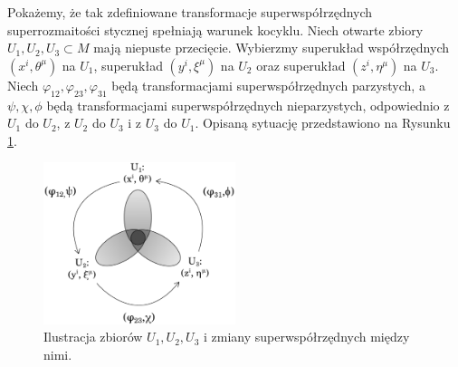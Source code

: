\documentclass[11pt,a4paper]{report}
\theoremstyle{definition}
\begin{document}
Pokażemy, że tak zdefiniowane transformacje superwspółrzędnych superrozmaitości stycznej spełniają warunek kocyklu. Niech otwarte zbiory $U_1, U_2, U_3 \subset M$ mają niepuste przecięcie. Wybierzmy superukład współrzędnych $(x^i, \theta^\mu)$ na $U_1$, superukład $(y^i, \xi^\mu)$ na $U_2$ oraz superukład $(z^i, \eta^\mu)$ na $U_3$. Niech $\varphi_{12},\varphi_{23},\varphi_{31}$ będą transformacjami superwspółrzędnych parzystych, a $\psi, \chi, \phi$ będą transformacjami superwspółrzędnych nieparzystych, odpowiednio z $U_1$ do $U_2$, z $U_2$ do $U_3$ i z $U_3$ do $U_1$. Opisaną sytuację przedstawiono na Rysunku \ref{fig:supertangent_coord}.
		      			
\begin{figure}[htb]
	\centering
	\includegraphics[width=0.5\textwidth]{supertangent_coord.pdf}
	\caption{Ilustracja zbiorów $U_1, U_2, U_3$ i zmiany superwspółrzędnych między nimi.}
	\label{fig:supertangent_coord}
\end{figure}
		      			
\end{document}

